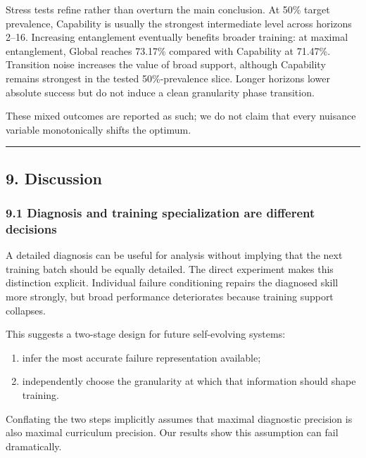\documentclass[
]{article}
\providecommand{\tightlist}{%
  \setlength{\itemsep}{0pt}\setlength{\parskip}{0pt}}
\begin{document}
Stress tests refine rather than overturn the main conclusion. At 50\%
target prevalence, Capability is usually the strongest intermediate
level across horizons 2--16. Increasing entanglement eventually benefits
broader training: at maximal entanglement, Global reaches 73.17\%
compared with Capability at 71.47\%. Transition noise increases the
value of broad support, although Capability remains strongest in the
tested 50\%-prevalence slice. Longer horizons lower absolute success but
do not induce a clean granularity phase transition.

These mixed outcomes are reported as such; we do not claim that every
nuisance variable monotonically shifts the optimum.

\begin{center}\rule{0.5\linewidth}{0.5pt}\end{center}

\subsection{9. Discussion}\label{discussion}

\subsubsection{9.1 Diagnosis and training specialization are different
decisions}\label{diagnosis-and-training-specialization-are-different-decisions}

A detailed diagnosis can be useful for analysis without implying that
the next training batch should be equally detailed. The direct
experiment makes this distinction explicit. Individual failure
conditioning repairs the diagnosed skill more strongly, but broad
performance deteriorates because training support collapses.

This suggests a two-stage design for future self-evolving systems:

\begin{enumerate}
\def\labelenumi{\arabic{enumi}.}
\tightlist
\item
  infer the most accurate failure representation available;
\item
  independently choose the granularity at which that information should
  shape training.
\end{enumerate}

Conflating the two steps implicitly assumes that maximal diagnostic
precision is also maximal curriculum precision. Our results show this
assumption can fail dramatically.
\end{document}
